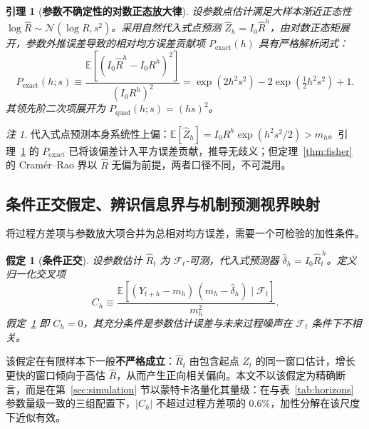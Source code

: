 \documentclass[10pt,UTF8,a4paper,zihao=-4]{ctexart}
\theoremstyle{plain}
\newtheorem{lemma}{引理}
\newtheorem{assumption}{假定}
\theoremstyle{remark}
\newtheorem{remark}{注}
\begin{document}
\begin{lemma}[\textbf{参数不确定性的对数正态放大律}]\label{lem:param_amplification}
设参数点估计满足大样本渐近正态性 $\log\hat{R} \sim \mathcal{N}(\log R, s^2)$。采用自然代入式点预测 $\hat{Z}_h = I_0 \hat{R}^h$，由对数正态矩展开，参数外推误差导致的相对均方误差贡献项 $P_{\text{exact}}(h)$ 具有严格解析闭式：
\begin{equation}
P_{\text{exact}}(h; s) \equiv \frac{\mathbb{E}[(I_0 \hat{R}^h - I_0 R^h)^2]}{(I_0 R^h)^2} = \exp(2 h^2 s^2) - 2\exp(\tfrac{1}{2} h^2 s^2) + 1. \label{eq:param_amplification}
\end{equation}
其领先阶二次项展开为 $P_{\text{quad}}(h; s) = (h s)^2$。
\end{lemma}

\begin{remark}\label{rem:plugin_bias}
代入式点预测本身系统性上偏：$\mathbb{E}[\hat{Z}_h] = I_0 R^h \exp(h^2 s^2/2) > m_h$。引理~\ref{lem:param_amplification} 的 $P_{\text{exact}}$ 已将该偏差计入平方误差贡献，推导无歧义；但定理~\ref{thm:fisher} 的 Cram\'er--Rao 界以 $\hat{R}$ 无偏为前提，两者口径不同，不可混用。
\end{remark}

\subsection{条件正交假定、辨识信息界与机制预测视界映射}\label{sec:horizon_theory}

将过程方差项与参数放大项合并为总相对均方误差，需要一个可检验的加性条件。

\begin{assumption}[\textbf{条件正交}]\label{assump:orthog}
设参数估计 $\hat{R}_t$ 为 $\mathcal{F}_t$-可测，代入式预测器 $\hat{\delta}_h = I_0 \hat{R}_t^{\,h}$。定义归一化交叉项
\begin{equation}
C_h \equiv \frac{\mathbb{E}\left[(Y_{t+h} - m_h)\,(m_h - \hat{\delta}_h) \mid \mathcal{F}_t\right]}{m_h^2}.
\label{eq:cross_term}
\end{equation}
假定~\ref{assump:orthog} 即 $C_h = 0$，其充分条件是参数估计误差与未来过程噪声在 $\mathcal{F}_t$ 条件下不相关。
\end{assumption}

该假定在有限样本下一般\textbf{不严格成立}：$\hat{R}_t$ 由包含起点 $Z_t$ 的同一窗口估计，增长更快的窗口倾向于高估 $\hat{R}$，从而产生正向相关偏向。本文不以该假定为精确断言，而是在第~\ref{sec:simulation} 节以蒙特卡洛量化其量级：在与表~\ref{tab:horizons} 参数量级一致的三组配置下，$|C_h|$ 不超过过程方差项的 $0.6\%$，加性分解在该尺度下近似有效。
\end{document}
